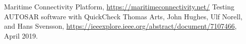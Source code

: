 \documentclass[a4paper]{article}
\begin{document}
\begin{thebibliography}{2}
		Maritime Connectivity Platform,
		\url{https://maritimeconnectivity.net/}
		Testing AUTOSAR software with QuickCheck
		Thomas Arts, John Hughes, Ulf Norell, and Hans Svensson,
		\url{https://ieeexplore.ieee.org/abstract/document/7107466},
		April 2019.
\end{thebibliography}
\end{document}
